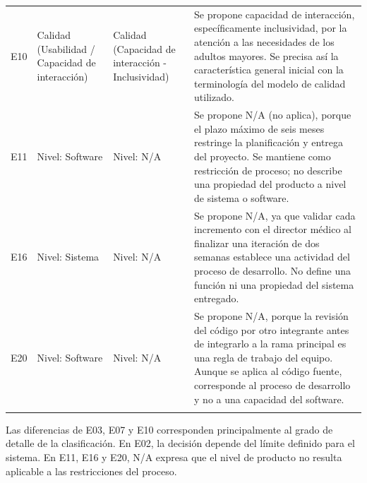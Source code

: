 \documentclass[10pt,a4paper]{article}
\begin{document}
\begin{longtable}{@{}>{\raggedright\arraybackslash}p{0.8cm}>{\raggedright\arraybackslash}p{3.2cm}>{\raggedright\arraybackslash}p{3.5cm}>{\raggedright\arraybackslash}p{6.3cm}@{}}
	E10 & Calidad (Usabilidad / Capacidad de interacción) & Calidad (Capacidad de interacción - Inclusividad) & Se propone capacidad de interacción, específicamente inclusividad, por la atención a las necesidades de los adultos mayores. Se precisa así la característica general inicial con la terminología del modelo de calidad utilizado. \\ \addlinespace
	
	E11 & Nivel: Software & Nivel: N/A & Se propone N/A (no aplica), porque el plazo máximo de seis meses restringe la planificación y entrega del proyecto. Se mantiene como restricción de proceso; no describe una propiedad del producto a nivel de sistema o software. \\ \addlinespace
	
	E16 & Nivel: Sistema & Nivel: N/A & Se propone N/A, ya que validar cada incremento con el director médico al finalizar una iteración de dos semanas establece una actividad del proceso de desarrollo. No define una función ni una propiedad del sistema entregado. \\ \addlinespace
	
	E20 & Nivel: Software & Nivel: N/A & Se propone N/A, porque la revisión del código por otro integrante antes de integrarlo a la rama principal es una regla de trabajo del equipo. Aunque se aplica al código fuente, corresponde al proceso de desarrollo y no a una capacidad del software. \\ \addlinespace
	
\end{longtable}
\normalsize

Las diferencias de E03, E07 y E10 corresponden principalmente al grado de detalle de la clasificación. En E02, la decisión depende del límite definido para el sistema. En E11, E16 y E20, N/A expresa que el nivel de producto no resulta aplicable a las restricciones del proceso.
	
\end{document}
